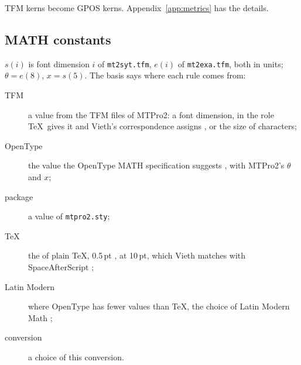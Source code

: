 \documentclass[10pt]{article}
\newcommand\file[1]{\texttt{#1}}
\newcommand\code[1]{\texttt{#1}}
\begin{document}
TFM kerns become GPOS kerns.  Appendix~\ref{app:metrics} has the
details.

\subsection{MATH constants}

$s(i)$ is font dimension $i$ of \file{mt2syt.tfm}, $e(i)$ of
\file{mt2exa.tfm}, both in units; $\theta = e(8)$, $x = s(5)$.  The
basis says where each rule comes from:

\begin{description}
\item[TFM] a value from the TFM files of MTPro2: a font dimension, in
  the role \TeX\ gives it \cite[\S\S700--701]{tex-program} and
  Vieth's correspondence assigns \cite[Tables 1--7]{vieth}, or the size
  of characters;
\item[OpenType] the value the OpenType MATH specification suggests
  \cite{opentype-math}, with MTPro2's $\theta$ and $x$;
\item[package] a value of \file{mtpro2.sty};
\item[\TeX] the \code{\string\scriptspace} of plain \TeX, 0.5\,pt
  \cite{plain-tex}, at 10\,pt, which Vieth matches with
  SpaceAfterScript \cite[Table 5]{vieth};
\item[Latin Modern] where OpenType has fewer values than \TeX, the
  choice of Latin Modern Math \cite{lm-math};
\item[conversion] a choice of this conversion.
\end{description}
\end{document}
